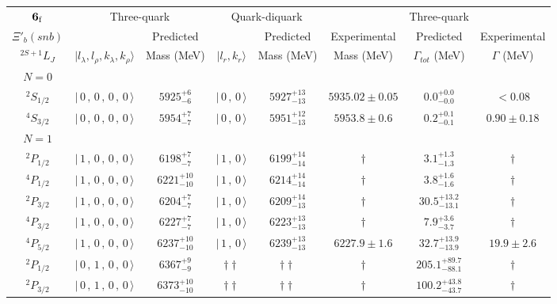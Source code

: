 \begin{tabular}{c| c c c c c c c}\hline \hline
${\bf {6}}_{\rm f}$ & \multicolumn{2}{c}{Three-quark} &  \multicolumn{2}{c}{Quark-diquark}   &    &  Three-quark  &\\ 
$\Xi'_{b}(snb)$ &   & Predicted  &   &  Predicted   &  Experimental &  Predicted            & Experimental \\ 
 $^{2S+1}L_{J}$ & $\vert l_{\lambda}, l_{\rho}, k_{\lambda}, k_{\rho} \rangle$ & Mass (MeV)  & $\vert l_{r}, k_{r} \rangle$  &  Mass (MeV)   &  Mass (MeV)   &  $\Gamma_{tot}$ (MeV) & $\Gamma$ (MeV) \\ \hline
\hline
 $N=0$  &  &  &  &  &  \\ 
$^{2}S_{1/2}$ & $\vert \,0\,,\,0\,,\,0\,,\,0 \,\rangle $ & $5925^{+6}_{-6}$ & $\vert \,0\,,\,0 \,\rangle$ & $5927^{+13}_{-13}$ & $5935.02\pm 0.05$ & $0.0^{+0.0}_{-0.0}$ & $<0.08$ \\ 
$^{4}S_{3/2}$ & $\vert \,0\,,\,0\,,\,0\,,\,0 \,\rangle $ & $5954^{+7}_{-7}$ & $\vert \,0\,,\,0 \,\rangle$ & $5951^{+12}_{-13}$ & $5953.8\pm 0.6$ & $0.2^{+0.1}_{-0.1}$ & $0.90\pm 0.18$ \\ 
\hline
 $N=1$  &  &  &  &  &  \\ 
$^{2}P_{1/2}$ & $\vert \,1\,,\,0\,,\,0\,,\,0 \,\rangle $ & $6198^{+7}_{-7}$ & $\vert \,1\,,\,0 \,\rangle$ & $6199^{+14}_{-14}$ & $\dagger$ & $3.1^{+1.3}_{-1.3}$ & $\dagger$ \\ 
$^{4}P_{1/2}$ & $\vert \,1\,,\,0\,,\,0\,,\,0 \,\rangle $ & $6221^{+10}_{-10}$ & $\vert \,1\,,\,0 \,\rangle$ & $6214^{+14}_{-14}$ & $\dagger$ & $3.8^{+1.6}_{-1.6}$ & $\dagger$ \\ 
$^{2}P_{3/2}$ & $\vert \,1\,,\,0\,,\,0\,,\,0 \,\rangle $ & $6204^{+7}_{-7}$ & $\vert \,1\,,\,0 \,\rangle$ & $6209^{+14}_{-13}$ & $\dagger$ & $30.5^{+13.2}_{-13.1}$ & $\dagger$ \\ 
$^{4}P_{3/2}$ & $\vert \,1\,,\,0\,,\,0\,,\,0 \,\rangle $ & $6227^{+7}_{-7}$ & $\vert \,1\,,\,0 \,\rangle$ & $6223^{+13}_{-13}$ & $\dagger$ & $7.9^{+3.6}_{-3.7}$ & $\dagger$ \\ 
$^{4}P_{5/2}$ & $\vert \,1\,,\,0\,,\,0\,,\,0 \,\rangle $ & $6237^{+10}_{-10}$ & $\vert \,1\,,\,0 \,\rangle$ & $6239^{+13}_{-13}$ & $6227.9\pm 1.6$ & $32.7^{+13.9}_{-13.9}$ & $19.9\pm 2.6$ \\ 
$^{2}P_{1/2}$ & $\vert \,0\,,\,1\,,\,0\,,\,0 \,\rangle $ & $6367^{+9}_{-9}$ & $\dagger\dagger$ & $\dagger\dagger$ & $\dagger$ & $205.1^{+89.7}_{-88.1}$ & $\dagger$ \\ 
$^{2}P_{3/2}$ & $\vert \,0\,,\,1\,,\,0\,,\,0 \,\rangle $ & $6373^{+10}_{-10}$ & $\dagger\dagger$ & $\dagger\dagger$ & $\dagger$ & $100.2^{+43.8}_{-43.7}$ & $\dagger$ \\ 

\end{tabular}
